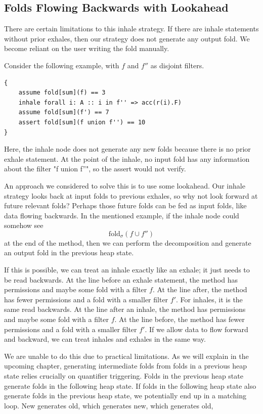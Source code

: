 \documentclass[msc,oneside]{ubcthesis}
\theoremstyle{definition}
\begin{document}
\subsection{Folds Flowing Backwards with Lookahead}
There are certain limitations to this inhale strategy. If there are inhale statements without prior exhales, then our strategy does not generate any output fold. We become reliant on the user writing the fold manually. 

Consider the following example, with $f$ and $f''$ as disjoint filters. 
\begin{lstlisting}
{
    assume fold[sum](f) == 3
    inhale forall i: A :: i in f'' => acc(r(i).F)
    assume fold[sum](f') == 7
    assert fold[sum](f union f'') == 10
}
\end{lstlisting}

Here, the inhale node does not generate any new folds because there is no prior exhale statement. At the point of the inhale, no input fold has any information about the filter "f union f''", so the assert would not verify. 

An approach we considered to solve this is to use some lookahead. Our inhale strategy looks back at input folds to previous exhales, so why not look forward at future relevant folds? Perhaps those future folds can be fed as input folds, like data flowing backwards. In the mentioned example, if the inhale node could somehow see $$\textrm{fold}_{\sigma}(f \cup f'')$$ at the end of the method, then we can perform the decomposition and generate an output fold in the previous heap state. 

If this is possible, we can treat an inhale exactly like an exhale; it just needs to be read backwards. At the line before an exhale statement, the method has permissions and maybe some fold with a filter $f$. At the line after, the method has fewer permissions and a fold with a smaller filter $f'$. For inhales, it is the same read backwards. At the line after an inhale, the method has permissions and maybe some fold with a filter $f$. At the line before, the method has fewer permissions and a fold with a smaller filter $f'$. If we allow data to flow forward and backward, we can treat inhales and exhales in the same way.

We are unable to do this due to practical limitations. As we will explain in the upcoming chapter, generating intermediate folds from folds in a previous heap state relies crucially on quantifier triggering. Folds in the previous heap state generate folds in the following heap state. If folds in the following heap state also generate folds in the previous heap state, we potentially end up in a matching loop. New generates old, which generates new, which generates old, \etc
\end{document}
